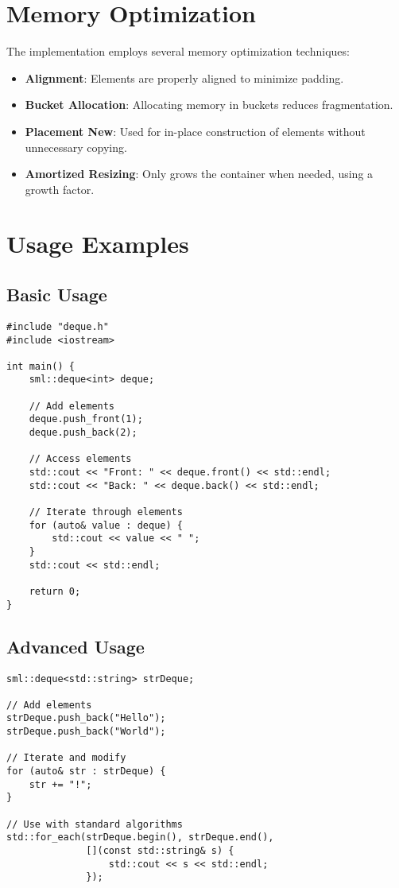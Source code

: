 \documentclass[a4paper,12pt]{article}
\begin{document}
\section{Memory Optimization}
The implementation employs several memory optimization techniques:

\begin{itemize}
    \item \textbf{Alignment}: Elements are properly aligned to minimize padding.
    \item \textbf{Bucket Allocation}: Allocating memory in buckets reduces fragmentation.
    \item \textbf{Placement New}: Used for in-place construction of elements without unnecessary copying.
    \item \textbf{Amortized Resizing}: Only grows the container when needed, using a growth factor.
\end{itemize}

\section{Usage Examples}

\subsection{Basic Usage}
\begin{lstlisting}
#include "deque.h"
#include <iostream>

int main() {
    sml::deque<int> deque;
    
    // Add elements
    deque.push_front(1);
    deque.push_back(2);
    
    // Access elements
    std::cout << "Front: " << deque.front() << std::endl;
    std::cout << "Back: " << deque.back() << std::endl;
    
    // Iterate through elements
    for (auto& value : deque) {
        std::cout << value << " ";
    }
    std::cout << std::endl;
    
    return 0;
}
\end{lstlisting}

\subsection{Advanced Usage}
\begin{lstlisting}
sml::deque<std::string> strDeque;

// Add elements
strDeque.push_back("Hello");
strDeque.push_back("World");

// Iterate and modify
for (auto& str : strDeque) {
    str += "!";
}

// Use with standard algorithms
std::for_each(strDeque.begin(), strDeque.end(), 
              [](const std::string& s) { 
                  std::cout << s << std::endl; 
              });
\end{lstlisting}
\end{document}
